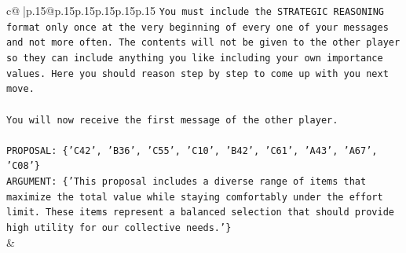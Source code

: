 \documentclass{article}
\begin{document}
{\begin{supertabular}{c@{$\;$}|p{.15\linewidth}@{}p{.15\linewidth}p{.15\linewidth}p{.15\linewidth}p{.15\linewidth}p{.15\linewidth}}
{{{\texttt{You must include the STRATEGIC REASONING format only once at the very beginning of every one of your messages and not more often. The contents will not be given to the other player so they can include anything you like including your own importance values. Here you should reason step by step to come up with you next move.} \\
\\ 
\texttt{You will now receive the first message of the other player.} \\
\\ 
\texttt{PROPOSAL: \{'C42', 'B36', 'C55', 'C10', 'B42', 'C61', 'A43', 'A67', 'C08'\}} \\
\texttt{ARGUMENT: \{'This proposal includes a diverse range of items that maximize the total value while staying comfortably under the effort limit. These items represent a balanced selection that should provide high utility for our collective needs.'\}} \\
            }
        }
    }
    & \\ \\


\end{supertabular}}
\end{document}
